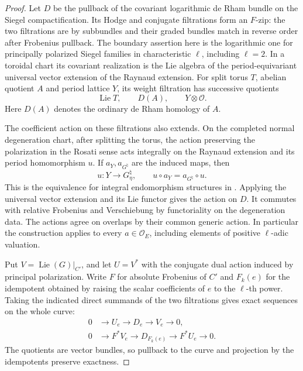 \begin{proof}
Let \(D\) be the pullback of the covariant logarithmic de Rham
bundle on the Siegel compactification. Its Hodge and conjugate
filtrations form an \(F\)-zip: the two filtrations are by subbundles
and their graded bundles match in reverse order after Frobenius
pullback. The boundary assertion here is the logarithmic one for
principally polarized Siegel families in characteristic \(\ell\),
including \(\ell=2\). In a toroidal chart its covariant realization
is the Lie algebra of the period-equivariant universal vector
extension of the Raynaud extension. For split torus \(T\), abelian
quotient \(A\) and period lattice \(Y\), its weight filtration has
successive quotients
\[
          \operatorname{Lie}T,\qquad D(A),\qquad Y\otimes\mathcal O .
\]
Here \(D(A)\) denotes the ordinary de Rham homology of \(A\). \cite[VI, Theorem~1.1]{faltings-chai}
\cite[\S2D, pp.~476--477]{vdg-looijenga-boundary-zip}

The coefficient action on these filtrations also extends. On the
completed normal degeneration chart, after splitting the torus,
the action preserving the polarization in the Rosati sense acts
integrally on the Raynaud extension and its period homomorphism
\(u\). If \(a_Y,a_{G^\natural}\) are the induced maps, then
\[
 u:Y\longrightarrow G^\natural_\eta,\qquad
          u\circ a_Y=a_{G^\natural}\circ u .
\]
This is the equivalence for integral endomorphism structures in
\cite[Theorem~5.1.1.4]{lan-pel-degeneration}.
Applying the universal vector extension and its Lie functor gives
the action on \(D\). It commutes with relative Frobenius and
Verschiebung by functoriality on the degeneration data. The
actions agree on overlaps by their common generic action. In
particular the construction applies to every \(a\in\mathcal O_E\),
including elements of positive \(\ell\)-adic valuation.

Put \(V=\operatorname{Lie}(G)|_{C'}\), and let \(U=V^*\) with the
conjugate dual action induced by principal polarization. Write
\(F\) for absolute Frobenius of \(C'\) and \(F_k(e)\) for the
idempotent obtained by raising the scalar coefficients of \(e\)
to the \(\ell\)-th power. Taking the indicated direct summands
of the two filtrations gives exact sequences on the whole curve:
\[
\begin{aligned}
 0&\longrightarrow U_e\longrightarrow D_e
                 \longrightarrow V_e\longrightarrow0,\\
 0&\longrightarrow F^*V_e\longrightarrow D_{F_k(e)}
                 \longrightarrow F^*U_e\longrightarrow0 .
\end{aligned}
\]
The quotients are vector bundles, so pullback to the curve and
projection by the idempotents preserve exactness.


\end{proof}
